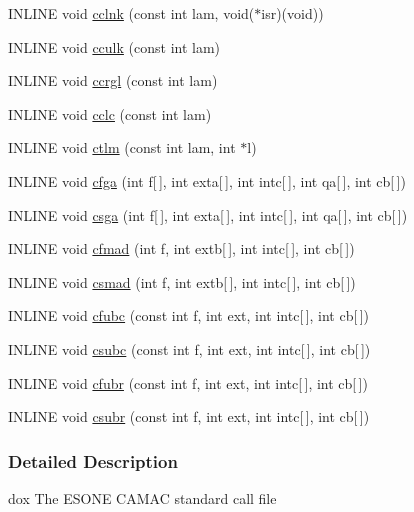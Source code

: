 \begin{DoxyCompactItemize}
\item 
INLINE void \hyperlink{esone_8c_a783e6a7777ca52b89826301edfe79c6d}{cclnk} (const int lam, void($\ast$isr)(void))
\item 
INLINE void \hyperlink{esone_8c_abd1bbcd4374fecb644cc6269671e5b06}{cculk} (const int lam)
\item 
INLINE void \hyperlink{esone_8c_a78cd4b969a357516903d9bf6698f7121}{ccrgl} (const int lam)
\item 
INLINE void \hyperlink{esone_8c_a9ed3915f053ab503de13e18cd1f5a82d}{cclc} (const int lam)
\item 
INLINE void \hyperlink{esone_8c_afb7daf2480c1df634658aebb91ab94c5}{ctlm} (const int lam, int $\ast$l)
\item 
INLINE void \hyperlink{esone_8c_ac2213e15aee8fa9269c4082abb1f9df9}{cfga} (int f\mbox{[}$\,$\mbox{]}, int exta\mbox{[}$\,$\mbox{]}, int intc\mbox{[}$\,$\mbox{]}, int qa\mbox{[}$\,$\mbox{]}, int cb\mbox{[}$\,$\mbox{]})
\item 
INLINE void \hyperlink{esone_8c_a2f2569deffeebd1016751ac662d2543d}{csga} (int f\mbox{[}$\,$\mbox{]}, int exta\mbox{[}$\,$\mbox{]}, int intc\mbox{[}$\,$\mbox{]}, int qa\mbox{[}$\,$\mbox{]}, int cb\mbox{[}$\,$\mbox{]})
\item 
INLINE void \hyperlink{esone_8c_a10b65b96bee13abd5aa5ddf145c586e8}{cfmad} (int f, int extb\mbox{[}$\,$\mbox{]}, int intc\mbox{[}$\,$\mbox{]}, int cb\mbox{[}$\,$\mbox{]})
\item 
INLINE void \hyperlink{esone_8c_a721f9a3b1bff9340d822e8f4e01a2ae2}{csmad} (int f, int extb\mbox{[}$\,$\mbox{]}, int intc\mbox{[}$\,$\mbox{]}, int cb\mbox{[}$\,$\mbox{]})
\item 
INLINE void \hyperlink{esone_8c_ae8137d2fe1de67c4160f926d04662da0}{cfubc} (const int f, int ext, int intc\mbox{[}$\,$\mbox{]}, int cb\mbox{[}$\,$\mbox{]})
\item 
INLINE void \hyperlink{esone_8c_a5e02aa0b87d8986d123f040088c7f789}{csubc} (const int f, int ext, int intc\mbox{[}$\,$\mbox{]}, int cb\mbox{[}$\,$\mbox{]})
\item 
INLINE void \hyperlink{esone_8c_a68a5e8b8598e4420f19e69c5bd76b8c8}{cfubr} (const int f, int ext, int intc\mbox{[}$\,$\mbox{]}, int cb\mbox{[}$\,$\mbox{]})
\item 
INLINE void \hyperlink{esone_8c_a0a61ab3bc925e399847d6249a43741da}{csubr} (const int f, int ext, int intc\mbox{[}$\,$\mbox{]}, int cb\mbox{[}$\,$\mbox{]})
\end{DoxyCompactItemize}


\subsubsection{Detailed Description}
dox The ESONE CAMAC standard call file 

